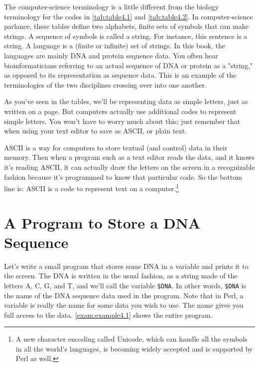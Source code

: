 The computer-science terminology is a little different from the biology terminology for the codes in \autoref{tab:table4.1} and \autoref{tab:table4.2}. In computer-science parlance, these tables define two alphabets, finite sets of symbols that can make strings. A sequence of symbols is called a string. For instance, this sentence is a string. A language is a (finite or infinite) set of strings. In this book, the languages are mainly DNA and protein sequence data. You often hear bioinformaticians referring to an actual sequence of DNA or protein as a "string," as opposed to its representation as sequence data. This is an example of the terminologies of the two disciplines crossing over into one another.

As you've seen in the tables, we'll be representing data as simple letters, just as written on a page. But computers actually use additional codes to represent simple letters. You won't have to worry much about this; just remember that when using your text editor to save as ASCII, or plain text.

ASCII is a way for computers to store textual (and control) data in their memory. Then when a program such as a text editor reads the data, and it knows it's reading ASCII, it can actually draw the letters on the screen in a recognizable fashion because it's programmed to know that particular code. So the bottom line is: ASCII is a code to represent text on a computer.\footnote{A new character encoding called Unicode, which can handle all the symbols in all the world's languages, is becoming widely accepted and is supported by Perl as well.}

\section{A Program to Store a DNA Sequence}
Let's write a small program that stores some DNA in a variable and prints it to the screen. The DNA is written in the usual fashion, as a string made of the letters A, C, G, and T, and we'll call the variable \verb|$DNA|. In other words, \verb|$DNA| is the name of the DNA sequence data used in the program. Note that in Perl, a variable is really the name for some data you wish to use. The name gives you full access to the data. \autoref{exam:example4.1} shows the entire program.



